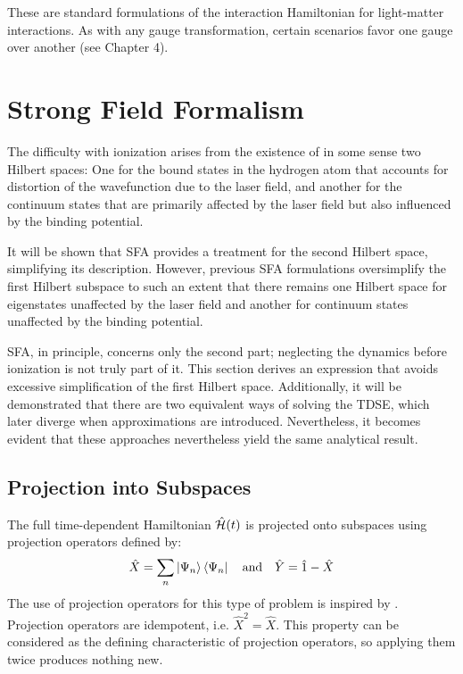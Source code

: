 \medskip
These are standard formulations of the interaction Hamiltonian for light-matter interactions. 
As with any gauge transformation, certain scenarios favor one gauge over another (see Chapter 4).











\section{Strong Field Formalism}

The difficulty with ionization arises from the existence of in some sense two Hilbert spaces: 
One for the bound states in the hydrogen atom that accounts for distortion of the wavefunction due to the laser field, and another for the continuum states that are primarily affected by the laser field but also influenced by the binding potential.

It will be shown that SFA provides a treatment for the second Hilbert space, simplifying its description. 
However, previous SFA formulations oversimplify the first Hilbert subspace to such an extent that there remains one Hilbert space for eigenstates unaffected by the laser field and another for continuum states unaffected by the binding potential.

SFA, in principle, concerns only the second part; neglecting the dynamics before ionization is not truly part of it.
This section derives an expression that avoids excessive simplification of the first Hilbert space.
Additionally, it will be demonstrated that there are two equivalent ways of solving the TDSE, which later diverge when approximations are introduced.
Nevertheless, it becomes evident that these approaches nevertheless yield the same analytical result.









\subsection{Projection into Subspaces}
The full time-dependent Hamiltonian $\hat{\mathcal{H}}(t)$ is projected onto subspaces using projection operators defined by:
\begin{equation*}   
    \hat{X} = \sum_{n}\ket{\Psi_n}\bra{\Psi_n}\quad\text{and}\quad\hat{Y}= \hat{1} - \hat{X}
\end{equation*}
The use of projection operators for this type of problem is inspired by \cite{feshbachmethod}.
Projection operators are idempotent, i.e. $\hat{X}^2=\hat{X}$.
This property can be considered as the defining characteristic of projection operators, so applying them twice produces nothing new.

